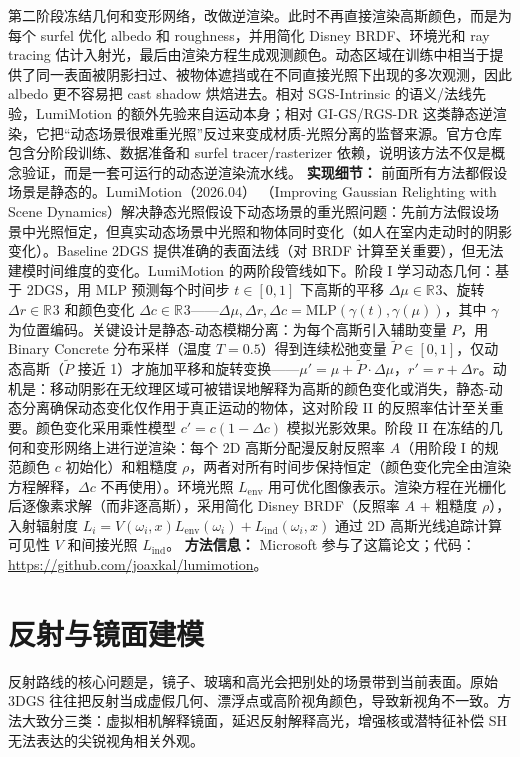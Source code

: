 第二阶段冻结几何和变形网络，改做逆渲染。此时不再直接渲染高斯颜色，而是为每个 surfel 优化 albedo 和 roughness，并用简化 Disney BRDF、环境光和 ray tracing 估计入射光，最后由渲染方程生成观测颜色。动态区域在训练中相当于提供了同一表面被阴影扫过、被物体遮挡或在不同直接光照下出现的多次观测，因此 albedo 更不容易把 cast shadow 烘焙进去。相对 SGS-Intrinsic 的语义/法线先验，LumiMotion 的额外先验来自运动本身；相对 GI-GS/RGS-DR 这类静态逆渲染，它把“动态场景很难重光照”反过来变成材质-光照分离的监督来源。官方仓库包含分阶段训练、数据准备和 surfel tracer/rasterizer 依赖，说明该方法不仅是概念验证，而是一套可运行的动态逆渲染流水线。
\textbf{实现细节：} 前面所有方法都假设场景是静态的。LumiMotion（2026.04） （Improving Gaussian Relighting with Scene Dynamics）解决静态光照假设下动态场景的重光照问题：先前方法假设场景中光照恒定，但真实动态场景中光照和物体同时变化（如人在室内走动时的阴影变化）。Baseline 2DGS 提供准确的表面法线（对 BRDF 计算至关重要），但无法建模时间维度的变化。LumiMotion 的两阶段管线如下。阶段 I 学习动态几何：基于 2DGS，用 MLP 预测每个时间步 $t \in [0,1]$ 下高斯的平移 $\Delta \mu \in \mathbb{R}^{}3$、旋转 $\Delta r \in \mathbb{R}^{}3$ 和颜色变化 $\Delta c \in \mathbb{R}^{}3$——$\Delta \mu, \Delta r, \Delta c = \mathrm{MLP}(\gamma(t), \gamma(\mu))$，其中 $\gamma$ 为位置编码。关键设计是静态-动态模糊分离：为每个高斯引入辅助变量 $P$，用 Binary Concrete 分布采样（温度 $T=0.5$）得到连续松弛变量 $\tilde{P} \in [0,1]$，仅动态高斯（$\tilde{P}$ 接近 1）才施加平移和旋转变换——$\mu' = \mu + \tilde{P} \cdot \Delta \mu$，$r' = r + \Delta r$。动机是：移动阴影在无纹理区域可被错误地解释为高斯的颜色变化或消失，静态-动态分离确保动态变化仅作用于真正运动的物体，这对阶段 II 的反照率估计至关重要。颜色变化采用乘性模型 $c' = c(1 - \Delta c)$ 模拟光影效果。阶段 II 在冻结的几何和变形网络上进行逆渲染：每个 2D 高斯分配漫反射反照率 $A$（用阶段 I 的规范颜色 $c$ 初始化）和粗糙度 $\rho$，两者对所有时间步保持恒定（颜色变化完全由渲染方程解释，$\Delta c$ 不再使用）。环境光照 $L_{\mathrm{env}}$ 用可优化图像表示。渲染方程在光栅化后逐像素求解（而非逐高斯），采用简化 Disney BRDF（反照率 $A$ + 粗糙度 $\rho$），入射辐射度 $L_i = V(\omega_i, x) L_{\mathrm{env}}(\omega_i) + L_{\mathrm{ind}}(\omega_i, x)$ 通过 2D 高斯光线追踪计算可见性 $V$ 和间接光照 $L_{\mathrm{ind}}$。
\textbf{方法信息：} Microsoft 参与了这篇论文；代码：\url{https://github.com/joaxkal/lumimotion}。
\section{反射与镜面建模}

反射路线的核心问题是，镜子、玻璃和高光会把别处的场景带到当前表面。原始 3DGS 往往把反射当成虚假几何、漂浮点或高阶视角颜色，导致新视角不一致。方法大致分三类：虚拟相机解释镜面，延迟反射解释高光，增强核或潜特征补偿 SH 无法表达的尖锐视角相关外观。


